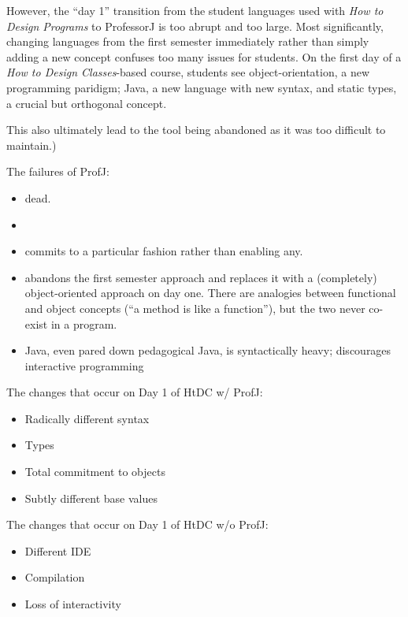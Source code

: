 \documentclass[submission,copyright]{eptcs}
\begin{document}
\def\htdp{\emph{How to Design Programs}\xspace}
\def\htdc{\emph{How to Design Classes}\xspace}
\def\profj{{ProfessorJ}\xspace}

However, the ``day 1'' transition from the student languages used with
\htdp to \profj is too abrupt and too large.
%
Most significantly, changing languages from the first semester
immediately rather than simply adding a new concept confuses too many
issues for students.  On the first day of a \htdc-based course,
students see object-orientation, a new programming paridigm; Java, a
new language with new syntax, and static types, a crucial but
orthogonal concept.


This also ultimately lead to the tool being abandoned
  as it was too difficult to maintain.)

The failures of  ProfJ:

\begin{itemize}
\item dead.
\item 

\item commits to a particular fashion rather than enabling any.

\item abandons the first semester approach and replaces it with a
  (completely) object-oriented approach on day one.  There are
  analogies between functional and object concepts (``a method is like
  a function''), but the two never co-exist in a program.

\item Java, even pared down pedagogical Java, is syntactically heavy; discourages
  interactive programming

\end{itemize}

The changes that occur on Day 1 of HtDC w/ ProfJ:

\begin{itemize}
\item Radically different syntax
\item Types
\item Total commitment to objects
\item Subtly different base values
\end{itemize}

The changes that occur on Day 1 of HtDC w/o ProfJ:

\begin{itemize}
\item Different IDE
\item Compilation
\item Loss of interactivity
\end{itemize}
\end{document}

